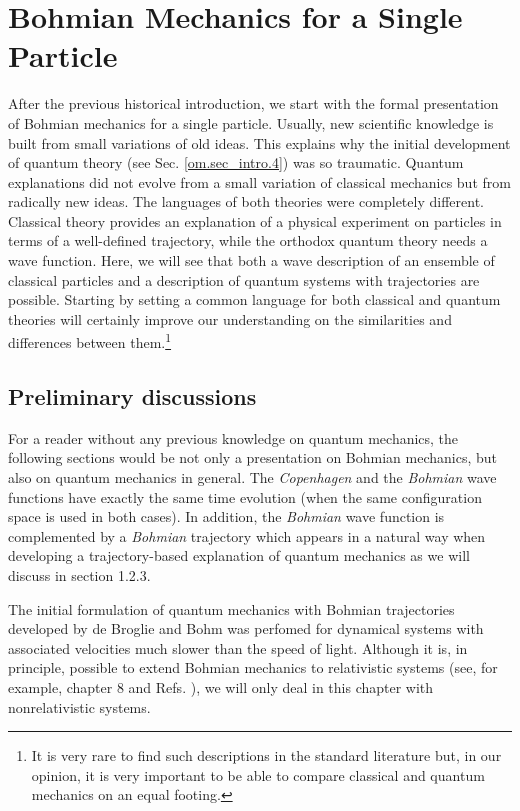 \documentclass[nofootinbib, secnumarabic, amsmath, nobibnotes,11pt,aps,pra, floatfix]{revtex4-1}
\newcommand{\sref}[1]{Sec. \ref{#1}}
\begin{document}
\vspace*{-1pc}
\section{Bohmian Mechanics for a Single Particle}\label{om.sec_single}

After the previous historical introduction, we start with the formal
presentation of Bohmian mechanics for a single particle. Usually,
new scientific knowledge is built from small variations of old
ideas. This explains why the initial development of quantum theory
(see \sref{om.sec_intro.4}) was so traumatic. Quantum explanations
did not evolve from a small variation of classical mechanics but
from radically new ideas. The languages of both theories were
completely different. Classical theory provides an explanation of a
physical experiment on particles in terms of a well-defined trajectory,
while the orthodox quantum theory needs a wave function. Here, we
will see that both a wave description of an ensemble of classical
particles and a description of quantum systems with trajectories are
possible. Starting by setting a common language for both classical
and quantum theories will certainly improve our understanding on the
similarities and differences between them.\footnote{It is very rare
to find such descriptions in the standard literature but, in our
opinion, it is very important to be able to compare classical and
quantum mechanics on an equal footing.}

\subsection{Preliminary discussions}\label{om.sec_single.1}

For a reader without any previous knowledge on quantum mechanics,
the following sections would be not only a presentation on Bohmian
mechanics, but also on quantum mechanics in general. The \textit{Copenhagen} and the \textit{Bohmian} wave functions have exactly the
same time evolution (when the same configuration space is used in both cases). In addition, the \textit{Bohmian} wave function is
complemented by a \textit{Bohmian} trajectory which appears in a natural
way when developing a trajectory-based explanation of quantum
mechanics as we will discuss in section 1.2.3.


The initial formulation of quantum mechanics with Bohmian
trajectories developed by de Broglie and Bohm was perfomed for dynamical
systems with associated velocities much slower than the speed of
light. Although it is, in principle, possible to extend Bohmian mechanics to
relativistic systems (see, for example, chapter 8 and Refs.
\cite{om.extra6,om.extra7,om.ward}), we will only deal in this
chapter with nonrelativistic systems.
\end{document}
